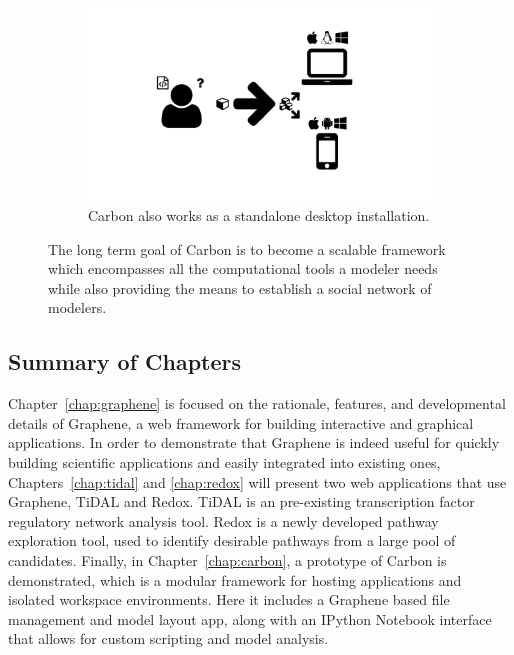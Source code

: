 \begin{figure}
  \begin{subfigure}[t]{0.45\textwidth}
    \includegraphics[width=\textwidth, page=32, trim=0cm 0cm 17cm 12cm, clip=true]{images/Figures.pdf}
    \caption{Carbon also works as a standalone desktop installation.}
    \label{Figure:redox-table-pinned}
  \end{subfigure}
  \caption{
  The long term goal of Carbon is to become a scalable framework which encompasses all the computational tools a modeler needs while also providing the means to establish a social network of modelers.
  }
  \label{Figure:redox-table}
\end{figure}

\subsection{Summary of Chapters}

Chapter~\ref{chap:graphene} is focused on the rationale, features, and developmental details of Graphene, a web framework for building interactive and graphical applications.
In order to demonstrate that Graphene is indeed useful for quickly building scientific applications and easily integrated into existing ones, Chapters~\ref{chap:tidal} and \ref{chap:redox} will present two web applications that use Graphene, TiDAL and Redox.
TiDAL is an pre-existing transcription factor regulatory network analysis tool.
Redox is a newly developed pathway exploration tool, used to identify desirable pathways from a large pool of candidates.
Finally, in Chapter~\ref{chap:carbon}, a prototype of Carbon is demonstrated, which is a modular framework for hosting applications and isolated workspace environments.
Here it includes a Graphene based file management and model layout app, along with an IPython Notebook interface that allows for custom scripting and model analysis.
